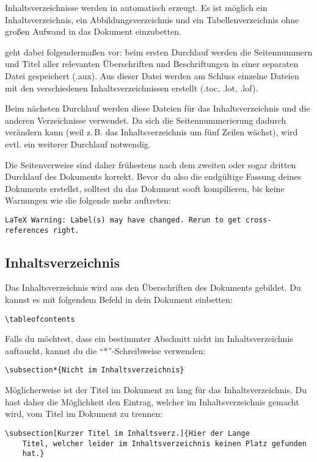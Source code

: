 Inhaltsverzeichnisse werden in \DMLLaTeX{} automatisch erzeugt. Es ist möglich ein Inhaltsverzeichnis, ein Abbildungsverzeichnis und ein Tabellenverzeichnis ohne großen Aufwand in das Dokument einzubetten.

\DMLLaTeX{} geht dabei folgendermaßen vor: beim ersten Durchlauf werden die Seitennummern und Titel aller relevanten Überschriften und Beschriftungen in einer separaten Datei gespeichert (.aux). Aus dieser Datei werden am Schluss einzelne Dateien mit den verschiedenen Inhaltsverzeichnissen erstellt (.toc, .lot, .lof).

Beim nächsten Durchlauf werden diese Dateien für das Inhaltsverzeichnis und die anderen Verzeichnisse verwendet. Da sich die Seitennummerierung dadurch verändern kann (weil z.\,B. das Inhaltsverzeichnis um fünf Zeilen wächst), wird evtl. ein weiterer Durchlauf notwendig.

Die Seitenverweise sind daher frühestens nach dem zweiten oder sogar dritten Durchlauf des Dokuments korrekt. Bevor du also die endgültige Fassung deines Dokuments erstellst, solltest du das Dokument sooft kompilieren, bis keine Warnungen wie die folgende mehr auftreten:
\begin{lstlisting}
LaTeX Warning: Label(s) may have changed. Rerun to get cross-references right.
\end{lstlisting}

\subsection{Inhaltsverzeichnis}

Das Inhaltsverzeichnis wird aus den Überschriften des Dokuments gebildet. Du kannst es mit folgendem Befehl in dein Dokument einbetten:
\begin{lstlisting}
\tableofcontents
\end{lstlisting}

Falls du möchtest, dass ein bestimmter Abschnitt nicht im Inhaltsverzeichnis auftaucht, kannst du die \enquote{*}-Schreibweise verwenden:
\begin{lstlisting}
\subsection*{Nicht im Inhaltsverzeichnis}
\end{lstlisting}

Möglicherweise ist der Titel im Dokument zu lang für das Inhaltsverzeichnis. Du hast daher die Möglichkeit den Eintrag, welcher im Inhaltsverzeichnis gemacht wird, vom Titel im Dokument zu trennen:
\begin{lstlisting}
\subsection[Kurzer Titel im Inhaltsverz.]{Hier der Lange
	Titel, welcher leider im Inhaltsverzeichnis keinen Platz gefunden
	hat.}
\end{lstlisting}
 


